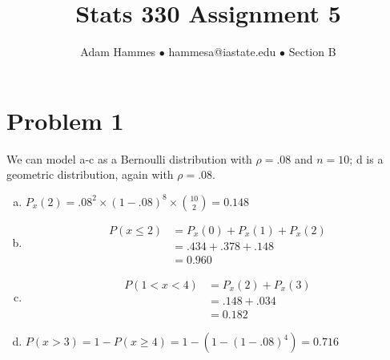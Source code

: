 \documentclass[11pt]{article}
\begin{document}
\title{Stats 330 Assignment 5}
\author{Adam Hammes $\bullet$ hammesa@iastate.edu $\bullet$ Section B}
\maketitle

\section*{Problem 1}
We can model a-c as a Bernoulli distribution with $\rho = .08$ and $n=10$; d is a geometric distribution, again with $\rho = .08$.

\begin{enumerate}[(a)]
	\item $P_x(2) = .08^2 \times (1-.08)^8 \times \binom{10}{2} = 0.148$
	\item
		\begin{align*}
			P(x \leq 2)&= P_x(0) + P_x(1) + P_x(2) \\
			&= .434 + .378 + .148 \\
			&=0 .960
		\end{align*}
	\item
		\begin{align*}
			P( 1 < x < 4) &= P_x(2) + P_x(3) \\
			&= .148 + .034 \\
			&= 0.182
		\end{align*}
	\item $P( x > 3 ) =1- P( x \geq 4) = 1-(1- (1-.08)^4) = 0.716$
\end{enumerate}
\end{document}
